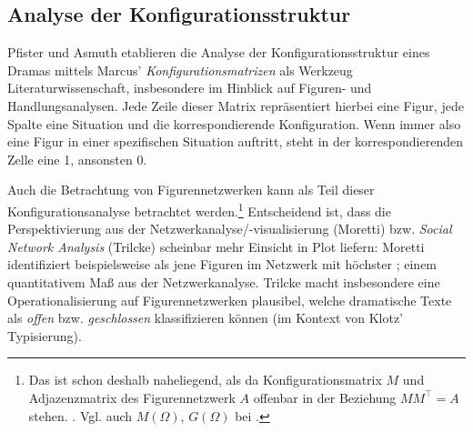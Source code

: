 \documentclass[a4paper,10pt,abstract=true,headings=small]{scrartcl}
\newcommand{\eng}[1]{\textenglish{\emph{#1}}}
\begin{document}
\subsection{Analyse der Konfigurationsstruktur}

Pfister und Asmuth etablieren die Analyse der Konfigurationsstruktur eines Dramas mittels Marcus' \emph{Konfigurationsmatrizen} als Werkzeug  Literaturwissenschaft, insbesondere im Hinblick auf Figuren- und Handlungsanalysen. %
Jede Zeile dieser Matrix repräsentiert hierbei eine Figur, jede Spalte eine Situation und die korrespondierende Konfiguration.
Wenn immer also eine Figur in einer spezifischen Situation auftritt, steht in der korrespondierenden Zelle eine 1, ansonsten 0.\autocites[Vgl.][140--141]{marcus_mathematisch-linguistisches_1971}[Vgl.][236--240]{pfister_drama:_2001}[Vgl.][44--47]{asmuth_einfuhrung_2016}

Auch die Betrachtung von Figurennetzwerken kann als Teil dieser Konfigurationsanalyse betrachtet werden.\footnote{Das ist schon deshalb naheliegend, als da Konfigurationsmatrix $M$ und Adjazenzmatrix des Figurennetzwerk $A$ offenbar in der Beziehung $MM^\intercal=A$ stehen. \cite[Siehe auch][201--203, 221--222]{trilcke_social_2013}. Vgl. auch $M(\Omega)$, $G(\Omega)$ bei \cite[140--142]{marcus_mathematisch-linguistisches_1971}.}
Entscheidend ist, dass die Perspektivierung aus der Netzwerkanalyse/-visualisierung (Moretti) bzw. \emph{Social Network Analysis} (Trilcke) scheinbar mehr Einsicht in Plot liefern:
Moretti identifiziert beispielsweise \textquote{\eng{protagonists}} als jene Figuren im Netzwerk mit höchster \textquote{\eng{closeness centrality}}; einem quantitativem Maß aus der Netzwerkanalyse.\autocite{moretti_network_2011} %
Trilcke macht insbesondere eine Operationalisierung auf Figurennetzwerken plausibel, welche dramatische Texte als \emph{offen} bzw. \emph{geschlossen} klassifizieren können (im Kontext von Klotz' Typisierung).\autocite{trilcke_social_2013}
\end{document}
